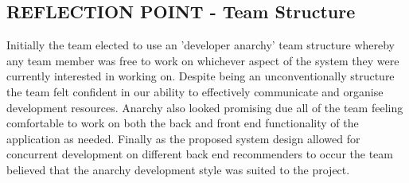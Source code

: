 \documentclass{l3proj}
\begin{document}
\subsection{REFLECTION POINT - Team Structure}
\label{sec:teamstructure}




Initially the team elected to use an 'developer anarchy' team structure whereby any team member was free to work on whichever aspect of the system they were currently interested in working on. Despite being an unconventionally structure the team felt confident in our ability to effectively communicate and organise development resources. Anarchy also looked promising due all of the team feeling comfortable to work on both the back and front end functionality of the application as needed. Finally as the proposed system design allowed for concurrent development on different back end recommenders to occur the team believed that the anarchy development style was suited to the project.
\end{document}
